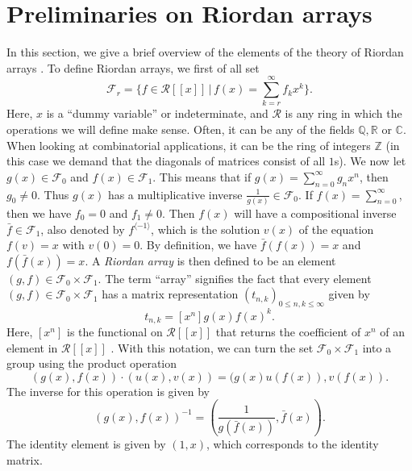 \documentclass[12pt,reqno]{article}
\theoremstyle{definition}
\begin{document}
\section{Preliminaries on Riordan arrays}
In this section, we give a brief overview of the elements of the theory of Riordan arrays \cite{book, book2, SGWW}.  To define Riordan arrays, we first of all set
$$\mathcal{F}_r= \{ f \in \mathcal{R}[[x]]\, |\, f(x)=\sum_{k=r}^{\infty} f_k x^k\}.$$
Here, $x$ is a ``dummy variable'' or indeterminate, and $\mathcal{R}$ is any ring in which the operations we will define make sense. Often, it can be any of the fields $\mathbb{Q}, \mathbb{R}$ or $\mathbb{C}$. When looking at combinatorial applications, it can be the ring of integers $\mathbb{Z}$ (in this case we demand that the diagonals of matrices consist of all $1$s).
We now let $g(x) \in \mathcal{F}_0$ and $f(x) \in \mathcal{F}_1$. This means that if $g(x)=\sum_{n=0}^{\infty} g_n x^n$, then $g_0 \ne 0$. Thus $g(x)$ has a multiplicative inverse $\frac{1}{g(x)} \in \mathcal{F}_0$. If $f(x)=\sum_{n=0}^{\infty}$, then we have $f_0=0$ and $f_1 \ne 0$. Then $f(x)$ will have a compositional inverse $\bar{f} \in \mathcal{F}_1$, also denoted by $f^{\langle -1 \rangle}$, which is the solution $v(x)$ of the equation $f(v)=x$ with $v(0)=0$. By definition, we have $\bar{f}(f(x))=x$ and $f(\bar{f}(x))=x$. A \emph{Riordan array} is then defined to be an element $(g, f) \in \mathcal{F}_0 \times \mathcal{F}_1$. The term ``array'' signifies the fact that every element $(g,  f)\in \mathcal{F}_0 \times \mathcal{F}_1$ has a matrix representation $(t_{n,k})_{0 \le n,k \le \infty}$ given by
$$ t_{n,k}=[x^n] g(x) f(x)^k.$$
Here, $[x^n]$ is the functional on $\mathcal{R}[[x]]$ that returns the coefficient of $x^n$ of an element in $\mathcal{R}[[x]]$ \cite{Method}.
With this notation, we can turn the set $\mathcal{F}_0 \times \mathcal{F}_1$ into a group using the product operation
$$(g(x), f(x)) \cdot (u(x), v(x)) = (g(x)u(f(x)), v(f(x)).$$
The inverse for this operation is given by
$$ (g(x), f(x))^{-1}= \left(\frac{1}{g(\bar{f}(x))}, \bar{f}(x)\right).$$
The identity element is given by $(1,x)$, which corresponds to the identity matrix.
\end{document}
